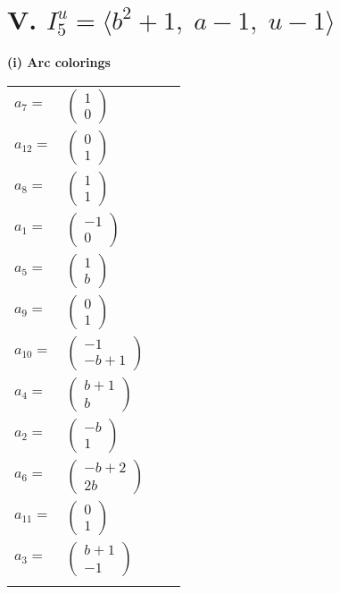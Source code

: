 \documentclass[1p]{elsarticle_modified}
\theoremstyle{definition}
\begin{document}
\centering \section*{V. $I^u_{5}= \langle b^2+1,\;a-1,\;u-1 \rangle$}
\flushleft \textbf{(i) Arc colorings}\\
\begin{tabular}{m{7pt} m{180pt} m{7pt} m{180pt} }
\flushright $a_{7}=$&$\begin{pmatrix}1\\0\end{pmatrix}$ \\
\flushright $a_{12}=$&$\begin{pmatrix}0\\1\end{pmatrix}$ \\
\flushright $a_{8}=$&$\begin{pmatrix}1\\1\end{pmatrix}$ \\
\flushright $a_{1}=$&$\begin{pmatrix}-1\\0\end{pmatrix}$ \\
\flushright $a_{5}=$&$\begin{pmatrix}1\\b\end{pmatrix}$ \\
\flushright $a_{9}=$&$\begin{pmatrix}0\\1\end{pmatrix}$ \\
\flushright $a_{10}=$&$\begin{pmatrix}-1\\- b+1\end{pmatrix}$ \\
\flushright $a_{4}=$&$\begin{pmatrix}b+1\\b\end{pmatrix}$ \\
\flushright $a_{2}=$&$\begin{pmatrix}- b\\1\end{pmatrix}$ \\
\flushright $a_{6}=$&$\begin{pmatrix}- b+2\\2 b\end{pmatrix}$ \\
\flushright $a_{11}=$&$\begin{pmatrix}0\\1\end{pmatrix}$ \\
\flushright $a_{3}=$&$\begin{pmatrix}b+1\\-1\end{pmatrix}$\\&\end{tabular}
\end{document}
